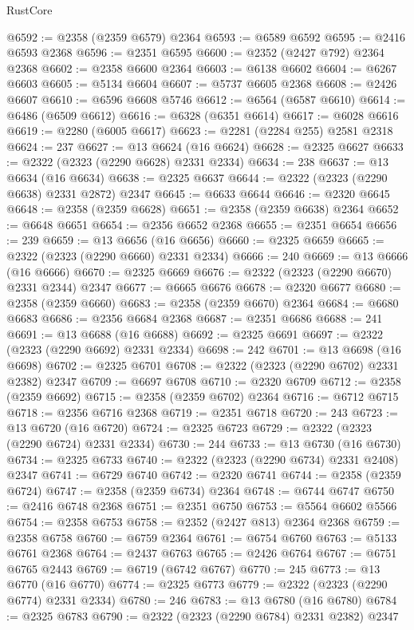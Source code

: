 \begin{lexlean}{RustCore}
\begin{coremodule}
@6592 := @2358 (@2359 @6579) @2364
@6593 := @6589 @6592
@6595 := @2416 @6593 @2368
@6596 := @2351 @6595
@6600 := @2352 (@2427 @792) @2364 @2368
@6602 := @2358 @6600 @2364
@6603 := @6138 @6602
@6604 := @6267 @6603
@6605 := @5134 @6604
@6607 := @5737 @6605 @2368
@6608 := @2426 @6607
@6610 := @6596 @6608 @5746
@6612 := @6564 (@6587 @6610)
@6614 := @6486 (@6509 @6612)
@6616 := @6328 (@6351 @6614)
@6617 := @6028 @6616
@6619 := @2280 (@6005 @6617)
@6623 := @2281 (@2284 @255) @2581 @2318
@6624 := 237
@6627 := @13 @6624 (@16 @6624)
@6628 := @2325 @6627
@6633 := @2322 (@2323 (@2290 @6628) @2331 @2334)
@6634 := 238
@6637 := @13 @6634 (@16 @6634)
@6638 := @2325 @6637
@6644 := @2322 (@2323 (@2290 @6638) @2331 @2872) @2347
@6645 := @6633 @6644
@6646 := @2320 @6645
@6648 := @2358 (@2359 @6628)
@6651 := @2358 (@2359 @6638) @2364
@6652 := @6648 @6651
@6654 := @2356 @6652 @2368
@6655 := @2351 @6654
@6656 := 239
@6659 := @13 @6656 (@16 @6656)
@6660 := @2325 @6659
@6665 := @2322 (@2323 (@2290 @6660) @2331 @2334)
@6666 := 240
@6669 := @13 @6666 (@16 @6666)
@6670 := @2325 @6669
@6676 := @2322 (@2323 (@2290 @6670) @2331 @2344) @2347
@6677 := @6665 @6676
@6678 := @2320 @6677
@6680 := @2358 (@2359 @6660)
@6683 := @2358 (@2359 @6670) @2364
@6684 := @6680 @6683
@6686 := @2356 @6684 @2368
@6687 := @2351 @6686
@6688 := 241
@6691 := @13 @6688 (@16 @6688)
@6692 := @2325 @6691
@6697 := @2322 (@2323 (@2290 @6692) @2331 @2334)
@6698 := 242
@6701 := @13 @6698 (@16 @6698)
@6702 := @2325 @6701
@6708 := @2322 (@2323 (@2290 @6702) @2331 @2382) @2347
@6709 := @6697 @6708
@6710 := @2320 @6709
@6712 := @2358 (@2359 @6692)
@6715 := @2358 (@2359 @6702) @2364
@6716 := @6712 @6715
@6718 := @2356 @6716 @2368
@6719 := @2351 @6718
@6720 := 243
@6723 := @13 @6720 (@16 @6720)
@6724 := @2325 @6723
@6729 := @2322 (@2323 (@2290 @6724) @2331 @2334)
@6730 := 244
@6733 := @13 @6730 (@16 @6730)
@6734 := @2325 @6733
@6740 := @2322 (@2323 (@2290 @6734) @2331 @2408) @2347
@6741 := @6729 @6740
@6742 := @2320 @6741
@6744 := @2358 (@2359 @6724)
@6747 := @2358 (@2359 @6734) @2364
@6748 := @6744 @6747
@6750 := @2416 @6748 @2368
@6751 := @2351 @6750
@6753 := @5564 @6602 @5566
@6754 := @2358 @6753
@6758 := @2352 (@2427 @813) @2364 @2368
@6759 := @2358 @6758
@6760 := @6759 @2364
@6761 := @6754 @6760
@6763 := @5133 @6761 @2368
@6764 := @2437 @6763
@6765 := @2426 @6764
@6767 := @6751 @6765 @2443
@6769 := @6719 (@6742 @6767)
@6770 := 245
@6773 := @13 @6770 (@16 @6770)
@6774 := @2325 @6773
@6779 := @2322 (@2323 (@2290 @6774) @2331 @2334)
@6780 := 246
@6783 := @13 @6780 (@16 @6780)
@6784 := @2325 @6783
@6790 := @2322 (@2323 (@2290 @6784) @2331 @2382) @2347

\end{coremodule}
\end{lexlean}
